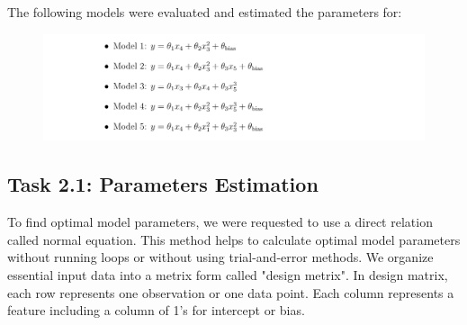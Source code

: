 \documentclass[12pt,a4paper]{article}
\begin{document}
The following models were evaluated and estimated the parameters for: 



\begin{figure}[H]
  \centering
  \includegraphics[width=\textwidth]{p1.png}
\end{figure}


\subsection*{Task 2.1: Parameters Estimation}

To find optimal model parameters, we were requested to use a direct relation called normal 
equation. This method helps to calculate optimal model parameters without running loops or
without using trial-and-error methods. We organize essential input data into a metrix form called 
"design metrix". In design matrix, each row represents one observation or one data point. Each column 
represents a feature including a column of 1's for intercept or bias. %

\end{document}
